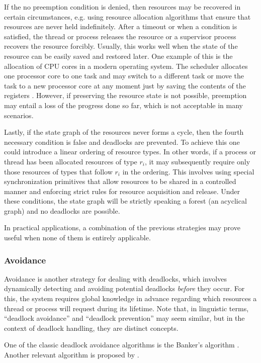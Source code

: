 \documentclass[../Thesis.tex]{subfiles}
\begin{document}
If the no preemption condition is denied, then resources may be recovered
in certain circumstances, e.g. using resource allocation algorithms that
ensure that resources are never held indefinitely.
After a timeout or when a condition is satisfied,
the thread or process releases the resource
or a supervisor process recovers the resource forcibly.
Usually, this works well when the state of the resource can be easily saved
and restored later.
One example of this is the allocation of CPU cores in a modern operating system.
The scheduler allocates one processor core to one task and
may switch to a different task or
move the task to a new processor core at any moment just
by saving the contents of the registers \cite[Chapter 6]{ArpaciDusseau2018}.
However, if preserving the resource state is not possible,
preemption may entail a loss of the progress done so far,
which is not acceptable in many scenarios.

Lastly, if the state graph of the resources never forms a cycle,
then the fourth necessary condition is false and deadlocks are prevented.
To achieve this one could introduce a linear ordering of resource types.
In other words, if a process or thread has been allocated resources of type $r_i$,
it may subsequently require only those resources
of types that follow $r_i$ in the ordering.
This involves using special synchronization primitives
that allow resources to be shared in a controlled manner and
enforcing strict rules for resource acquisition and release.
Under these conditions, the state graph will be strictly speaking
a forest (an acyclical graph) and no deadlocks are possible.

In practical applications, a combination of the previous strategies may prove useful
when none of them is entirely applicable.
\subsubsection{Avoidance}

Avoidance is another strategy for dealing with deadlocks,
which involves dynamically detecting and
avoiding potential deadlocks \emph{before} they occur.
For this, the system requires global knowledge in advance regarding
which resources a thread or process will request during its lifetime.
Note that, in linguistic terms,
``deadlock avoidance'' and ``deadlock prevention'' may seem similar,
but in the context of deadlock handling, they are distinct concepts.

One of the classic deadlock avoidance algorithms
is the Banker's algorithm \cite{dijkstra1964}.
Another relevant algorithm is proposed by \cite{habermann1969prevention}.
\end{document}
